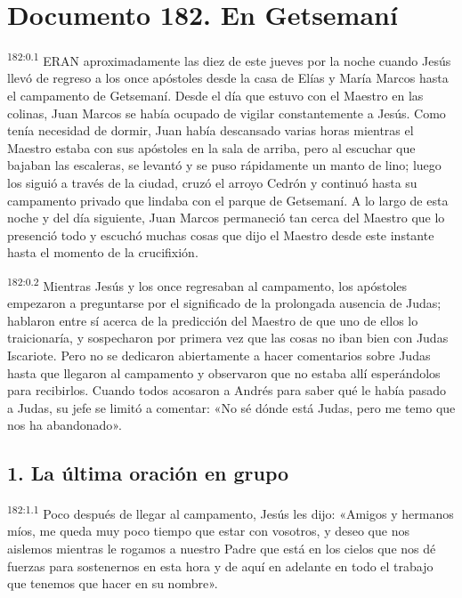 \chapter{Documento 182. En Getsemaní}
\par 
\textsuperscript{182:0.1} ERAN aproximadamente las diez de este jueves por la noche cuando Jesús llevó de regreso a los once apóstoles desde la casa de Elías y María Marcos hasta el campamento de Getsemaní. Desde el día que estuvo con el Maestro en las colinas, Juan Marcos se había ocupado de vigilar constantemente a Jesús. Como tenía necesidad de dormir, Juan había descansado varias horas mientras el Maestro estaba con sus apóstoles en la sala de arriba, pero al escuchar que bajaban las escaleras, se levantó y se puso rápidamente un manto de lino; luego los siguió a través de la ciudad, cruzó el arroyo Cedrón y continuó hasta su campamento privado que lindaba con el parque de Getsemaní. A lo largo de esta noche y del día siguiente, Juan Marcos permaneció tan cerca del Maestro que lo presenció todo y escuchó muchas cosas que dijo el Maestro desde este instante hasta el momento de la crucifixión.

\par 
\textsuperscript{182:0.2} Mientras Jesús y los once regresaban al campamento, los apóstoles empezaron a preguntarse por el significado de la prolongada ausencia de Judas; hablaron entre sí acerca de la predicción del Maestro de que uno de ellos lo traicionaría, y sospecharon por primera vez que las cosas no iban bien con Judas Iscariote. Pero no se dedicaron abiertamente a hacer comentarios sobre Judas hasta que llegaron al campamento y observaron que no estaba allí esperándolos para recibirlos. Cuando todos acosaron a Andrés para saber qué le había pasado a Judas, su jefe se limitó a comentar: «No sé dónde está Judas, pero me temo que nos ha abandonado».

\section*{1. La última oración en grupo}
\par 
\textsuperscript{182:1.1} Poco después de llegar al campamento, Jesús les dijo: «Amigos y hermanos míos, me queda muy poco tiempo que estar con vosotros, y deseo que nos aislemos mientras le rogamos a nuestro Padre que está en los cielos que nos dé fuerzas para sostenernos en esta hora y de aquí en adelante en todo el trabajo que tenemos que hacer en su nombre».

